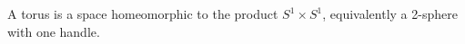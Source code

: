 A torus is a space homeomorphic to the product $S^1 \times S^1$, equivalently a 2-sphere with one handle.

